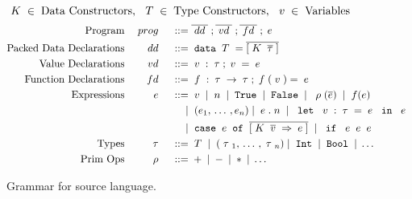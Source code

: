 \begin{figure}
    \begin{displaymath}
    \; {K} \; \in \; \textup{Data Constructors}, \:\: \; {T} \; \in \; \textup{Type Constructors}, \:\: \; v \; \in \; \textup{Variables}
  \end{displaymath} 
  \begin{displaymath}
    \begin{aligned}
      \textup{Program} && \PROG && \gramdef &
        \overline{\DD} \;; \overline{\VD} \; ; \overline{\FD} \; ; \EXPR 
        \\
      \textup{Packed Data Declarations} && \DD && \gramdef & \DATA \TC = \overline{[\DC \; \overline{\sTYP}\;]} \\
      \textup{Value Declarations}    && \VD && \gramdef & \var : \TYP  ; \var = \EXPR \\ 
      \textup{Function Declarations} && \FD && \gramdef &
         \fvar : \TYP \ARROW \TYP; 
         \fvar({\var}) = \EXPR \\ 
      \textup{Expressions} && \EXPR && \gramdef & \var \gramor \num \gramor \gramwd{True} \gramor \gramwd{False}
                                  \gramor \primexpr{\overline{\sEXPR}} \gramor 
       \app{f}{\sEXPR} \\
%
      && && \gramor & 
      \;(e_1,\, \dots\, , e_n) \gramor \EXPR.\num 
      \gramor \letexpr{\var:\TYP}{\EXPR}{\EXPR} \\
      && && \gramor & \case{\sEXPR}{\overline{[\bind{\DC \; \overline{\svar} \;}{\EXPR}]}} \gramor  \ife{\EXPR}{\EXPR}{\EXPR} \\
      \textup{Types} && \TYP && \gramdef &
         \TC \gramor
         \;(\TYP_1,\, \dots\, , \TYP_n)
         \gramor \gramwd{Int} \gramor \gramwd{Bool} \gramor \dots
      \\
      \textup{Prim Ops} && \PRIM && \gramdef & + \gramor - \gramor * \gramor \ldots \\
    \end{aligned}
  \end{displaymath}
   \vspace{-4mm}
  \caption{Grammar for source language.}
  \label{fig:source}
\end{figure}

